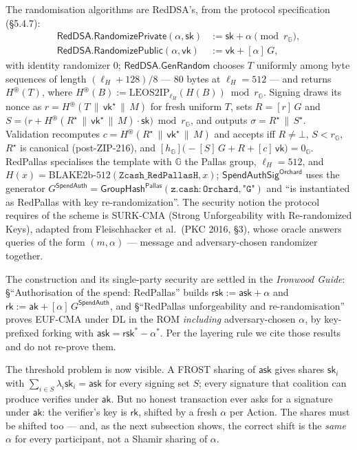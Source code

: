 \documentclass[11pt,a4paper]{article}
\theoremstyle{definition}
\newcommand{\G}{\mathbb{G}}
\newcommand{\rk}{\mathsf{rk}}
\newcommand{\Pallas}{\ensuremath{\mathsf{Pallas}}}
\newcommand{\ask}{\ensuremath{\mathsf{ask}}}
\newcommand{\aksym}{\ensuremath{\mathsf{ak}}}
\newcommand{\rsk}{\ensuremath{\mathsf{rsk}}}
\begin{document}
The randomisation algorithms are RedDSA's, from the protocol
specification (\S5.4.7):
\begin{align*}
\mathsf{RedDSA.RandomizePrivate}(\alpha, \mathsf{sk})
  &:= \mathsf{sk} + \alpha \pmod{r_{\G}}, \\
\mathsf{RedDSA.RandomizePublic}(\alpha, \mathsf{vk})
  &:= \mathsf{vk} + [\alpha]\,G,
\end{align*}
with identity randomizer $0$; $\mathsf{RedDSA.GenRandom}$ chooses $T$
uniformly among byte sequences of length $(\ell_H + 128)/8$ --- $80$
bytes at $\ell_H = 512$ --- and returns $H^{\circledast}(T)$, where
$H^{\circledast}(B) := \mathrm{LEOS2IP}_{\ell_H}(H(B)) \bmod r_{\G}$.
Signing draws its nonce as
$r = H^{\circledast}(T \,\|\, \mathsf{vk}^\star \,\|\, M)$ for fresh
uniform $T$, sets $R = [r]\,G$ and
$S = \bigl(r + H^{\circledast}(R^\star \,\|\, \mathsf{vk}^\star \,\|\, M)
\cdot \mathsf{sk}\bigr) \bmod r_{\G}$, and outputs
$\sigma = R^\star \,\|\, S^\star$. Validation recomputes
$c = H^{\circledast}(R^\star \,\|\, \mathsf{vk}^\star \,\|\, M)$ and
accepts iff $R \ne \bot$, $S < r_{\G}$, $R^\star$ is canonical
(post-ZIP-216), and
$[h_{\G}]\bigl(-[S]\,G + R + [c]\,\mathsf{vk}\bigr) = 0_{\G}$. RedPallas
specialises the template with $\G$ the Pallas group, $\ell_H = 512$, and
$H(x) = \mathrm{BLAKE2b}\text{-}512(\texttt{Zcash\_RedPallasH}, x)$;
$\mathsf{SpendAuthSig}^{\mathsf{Orchard}}$ uses the generator
$G^{\mathsf{SpendAuth}} =
\mathsf{GroupHash}^{\Pallas}(\mathtt{z.cash:Orchard}, \texttt{"G"})$ and
``is instantiated as RedPallas with key re-randomization''. The security
notion the protocol requires of the scheme is SURK-CMA (Strong
Unforgeability with Re-randomized Keys), adapted from Fleischhacker et
al.\ (PKC 2016, \S3), whose oracle answers queries of the form
$(m, \alpha)$ --- message and adversary-chosen randomizer together.

The construction and its single-party security are settled in the
\emph{Ironwood Guide}: \S``Authorisation of the spend: RedPallas'' builds
$\rsk := \ask + \alpha$ and
$\rk := \aksym + [\alpha]\,G^{\mathsf{SpendAuth}}$, and
\S``RedPallas unforgeability and re-randomisation'' proves EUF-CMA under
DL in the ROM \emph{including} adversary-chosen $\alpha$, by key-prefixed
forking with $\ask = \rsk^* - \alpha^*$. Per the layering
rule we cite those results and do not re-prove them.

The threshold problem is now visible. A FROST sharing of $\ask$
gives shares $\mathsf{sk}_i$ with
$\sum_{i \in S} \lambda_i \mathsf{sk}_i = \ask$ for every signing
set $S$; every signature that coalition can produce verifies under
$\aksym$. But no honest transaction ever asks for a signature under
$\aksym$: the verifier's key is $\rk$, shifted by a fresh
$\alpha$ per Action. The shares must be shifted too --- and, as the next
subsection shows, the correct shift is the \emph{same} $\alpha$ for every
participant, not a Shamir sharing of $\alpha$.
\end{document}
